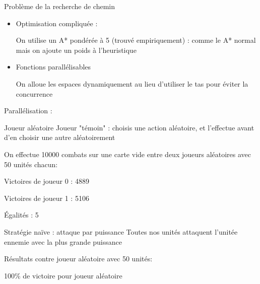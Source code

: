 \documentclass[french]{beamer}
\begin{document}
\begin{frame}{Problème de la recherche de chemin}
	\begin{itemize}
		\item Optimisation compliquée :
		
		On utilise un A* pondérée à 5 (trouvé empiriquement) : comme le A* normal mais on ajoute un poids à l'heuristique
		
		\item Fonctions parallélisables
		
		On alloue les espaces dynamiquement au lieu d'utiliser le tas pour éviter la concurrence
	\end{itemize}
Parallélisation :
\begin{center}
\end{center}

\end{frame}
\begin{frame}{Joueur aléatoire}
	Joueur "témoin" : choisis une action aléatoire, et l'effectue avant d'en choisir une autre aléatoirement
	\vspace*{1em}
	
	On effectue 10000 combats sur une carte vide entre deux joueurs aléatoires avec 50 unités chacun:
	\vspace*{1em}
	
	Victoires de joueur 0 : 4889
	
	Victoires de joueur 1 : 5106
	
	Égalités : 5
\end{frame}
\begin{frame}{Stratégie naïve : attaque par puissance}
	Toutes nos unités attaquent l'unitée ennemie avec la plus grande puissance
	\vspace*{1em}
	
	Résultats contre joueur aléatoire avec 50 unités:
	\vspace*{1em}
	
	100\% de victoire pour joueur aléatoire
\end{frame}
\end{document}
